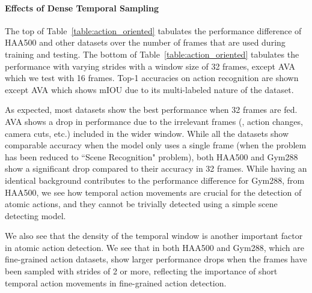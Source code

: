 \documentclass[10pt,twocolumn,letterpaper]{article}
\begin{document}
\paragraph{Effects of Dense Temporal Sampling}

The top of Table~\ref{table:action_oriented} tabulates the performance difference of HAA500 and other datasets over the number of frames that are used during training and testing. The bottom of Table~\ref{table:action_oriented} tabulates the performance with varying strides with a window size of 32 frames, except AVA which we test with 16 frames. Top-1 accuracies on action recognition are shown except AVA which shows mIOU due to its multi-labeled nature of the dataset. 

As expected, most datasets show the best performance when 32 frames are fed. AVA shows a drop in performance due to the irrelevant frames (\eg, action changes, camera cuts, etc.) included in the wider window. While all the datasets show comparable accuracy when the model only uses a single frame (\ie when the problem has been reduced to ``Scene Recognition" problem), both HAA500 and Gym288 show a significant drop compared to their accuracy in 32 frames. While having an identical background contributes to the performance difference for Gym288, from HAA500, we see how temporal action movements are crucial for the detection of atomic actions, and they cannot be trivially detected using a simple scene detecting model. 

We also see that the density of the temporal window is another important factor in atomic action detection. We see that in both HAA500 and Gym288, which are fine-grained action datasets, show larger performance drops when the frames have been sampled with strides of 2 or more, reflecting the importance of short temporal action movements in fine-grained action detection.
\end{document}
